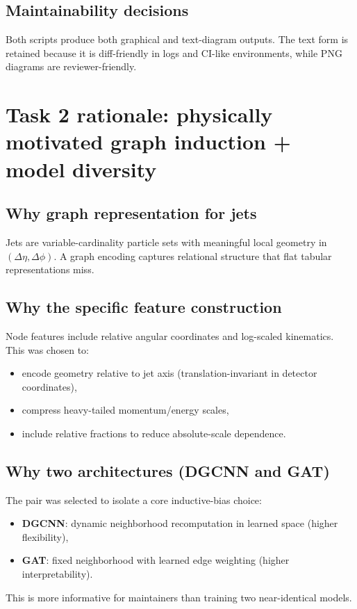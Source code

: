\documentclass[11pt]{article}
\begin{document}
\subsection{Maintainability decisions}
Both scripts produce both graphical and text-diagram outputs. The text form is retained because
it is diff-friendly in logs and CI-like environments, while PNG diagrams are reviewer-friendly.

\section{Task 2 rationale: physically motivated graph induction + model diversity}
\subsection{Why graph representation for jets}
Jets are variable-cardinality particle sets with meaningful local geometry in
$(\Delta\eta,\Delta\phi)$. A graph encoding captures relational structure that flat tabular
representations miss.

\subsection{Why the specific feature construction}
Node features include relative angular coordinates and log-scaled kinematics. This was chosen to:
\begin{itemize}[leftmargin=1.3em]
    \item encode geometry relative to jet axis (translation-invariant in detector coordinates),
    \item compress heavy-tailed momentum/energy scales,
    \item include relative fractions to reduce absolute-scale dependence.
\end{itemize}

\subsection{Why two architectures (DGCNN and GAT)}
The pair was selected to isolate a core inductive-bias choice:
\begin{itemize}[leftmargin=1.3em]
    \item \textbf{DGCNN}: dynamic neighborhood recomputation in learned space (higher flexibility),
    \item \textbf{GAT}: fixed neighborhood with learned edge weighting (higher interpretability).
\end{itemize}
This is more informative for maintainers than training two near-identical models.
\end{document}
